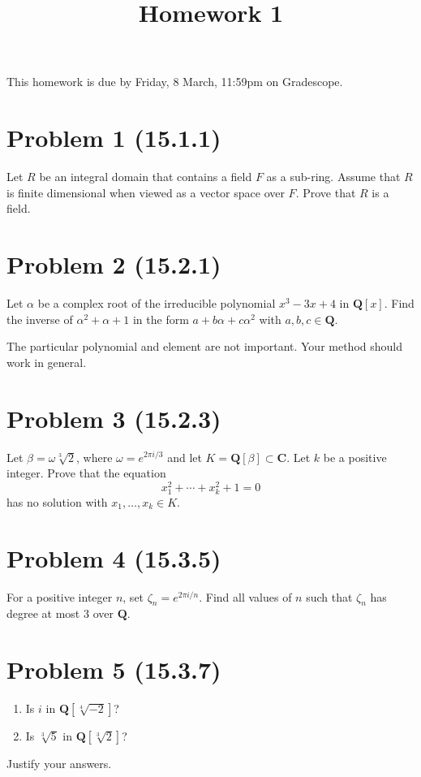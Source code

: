 \documentclass{amsart}
\date{}
\title{Homework 1}
\begin{document}
\maketitle
This homework is due by Friday, 8 March, 11:59pm on Gradescope.

\section{Problem 1 (15.1.1)}
\label{sec:org895e3f1}
Let \(R\) be an integral domain that contains a field \(F\) as a sub-ring.
Assume that \(R\) is finite dimensional when viewed as a vector space over \(F\).
Prove that \(R\) is a field.

\section{Problem 2 (15.2.1)}
\label{sec:orgb8da7c2}
Let \(\alpha\) be a complex root of the irreducible polynomial \(x^{3}-3x+4\) in \(\mathbf{Q}[x]\).
Find the inverse of \(\alpha^2+\alpha+1\) in the form \(a + b \alpha + c \alpha^{2}\) with \(a, b, c \in \mathbf{Q}\).

The particular polynomial and element are not important.
Your method should work in general.


\section{Problem 3 (15.2.3)}
\label{sec:org3fe7d54}
Let \(\beta = \omega \sqrt[3]{2}\), where \(\omega = e^{2\pi i / 3}\) and let \(K = \mathbf{Q}[\beta] \subset \mathbf{C}\).
Let \(k\) be a positive integer.
Prove that the equation
\[ x_1^2 + \cdots + x_k^2 + 1 = 0\]
has no solution with \(x_1, \dots, x_{k} \in K\).


\section{Problem 4 (15.3.5)}
\label{sec:orgf50b326}
For a positive integer \(n\), set \(\zeta_{n} = e^{2\pi i / n}\).
Find all values of \(n\) such that \(\zeta_{n}\) has degree at most 3 over \(\mathbf{Q}\).

\section{Problem 5 (15.3.7)}
\label{sec:org4e24735}
\begin{enumerate}
\item Is \(i\) in \(\mathbf{Q}[\sqrt[4]{-2}]\)?
\item Is \(\sqrt[3]5\) in \(\mathbf{Q}[\sqrt[3]2]\)?
\end{enumerate}

Justify your answers.
\end{document}
